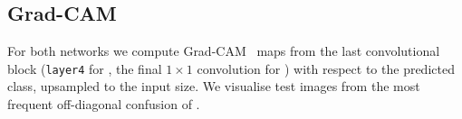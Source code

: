 \subsection{Grad-CAM}
For both networks we compute Grad-CAM~\cite{selvaraju2017gradcam} maps from the last convolutional block (\texttt{layer4} for \rn, the final $1\times1$ convolution for \eb) with respect to the predicted class, upsampled to the input size.
We visualise test images from the most frequent off-diagonal confusion of \rn.
